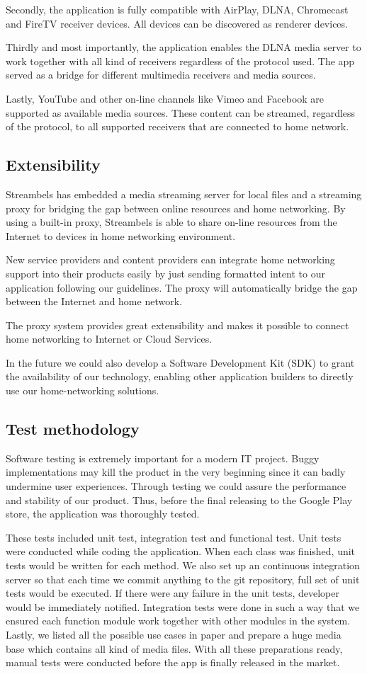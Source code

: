 Secondly, the application is fully compatible with AirPlay, DLNA, Chromecast and FireTV receiver devices. All devices can be discovered as renderer devices.

Thirdly and most importantly, the application enables the DLNA media server to work together with all kind of receivers regardless of the protocol used. The app served as a bridge for different multimedia receivers and media sources.

Lastly, YouTube and other on-line channels like Vimeo and Facebook are supported as available media sources. These content can be streamed, regardless of the protocol, to all supported receivers that are connected to home network.

\subsection{Extensibility\label{3_5}}
Streambels has embedded a media streaming server for local files and a streaming proxy for bridging the gap between online resources and home networking. By using a built-in proxy, Streambels is able to share on-line resources from the Internet to devices in home networking environment.

New service providers and content providers can integrate home networking support into their products easily by just sending formatted intent to our application following our guidelines. The proxy will automatically bridge the gap between the Internet and home network.

The proxy system provides great extensibility and makes it possible to connect home networking to Internet or Cloud Services.

In the future we could also develop a Software Development Kit (SDK) to grant the availability of our technology, enabling other application builders to directly use our home-networking solutions.
\subsection{Test methodology\label{3_6}}
Software testing is extremely important for a modern IT project. Buggy implementations may kill the product in the very beginning since it can badly undermine user experiences. Through testing we could assure the performance and stability of our product. Thus, before the final releasing to the Google Play store, the application was thoroughly tested.

These tests included unit test, integration test and functional test.
Unit tests were conducted while coding the application. When each class was finished, unit tests would be written for each method. We also set up an continuous integration server so that each time we commit anything to the git repository, full set of unit tests would be executed. If there were any failure in the unit tests, developer would be immediately notified. Integration tests were done in such a way that we ensured each function module work together with other modules in the system. Lastly, we listed all the possible use cases in paper and prepare a huge media base which contains all kind of media files. With all these preparations ready, manual tests were conducted before the app is finally released in the market.

